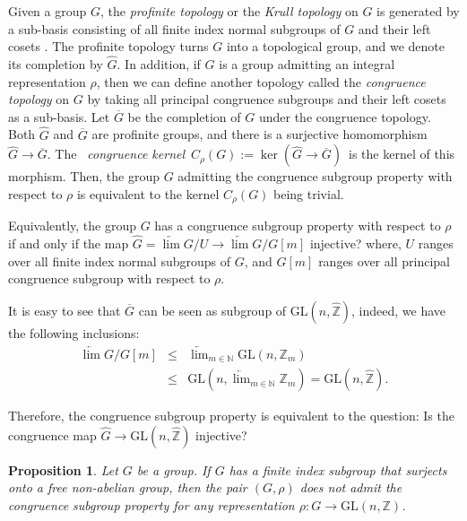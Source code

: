 \documentclass[12pt]{amsart}
\newtheorem{proposition}[equation]{Proposition}
\theoremstyle{definition}
\numberwithin{equation}{section}
\newcommand{\GL}{\mathrm{GL}}
\begin{document}
Given a group $G$, the {\it profinite topology} or the {\it Krull topology} on $G$ is generated by a sub-basis consisting of all finite index normal subgroups of $G$ and their left cosets \cite[Section 3.7]{surybook}. The profinite topology turns $G$ into a topological group, and we denote its completion by $\widehat{G}$. In addition, if $G$ is a group admitting an integral representation $\rho$, then we can define another topology called the {\it congruence topology} on $G$ by taking all principal congruence subgroups and their left cosets as a sub-basis. Let $\overline{G}$ be the completion of $G$ under the congruence topology. Both $\widehat{G}$ and $\overline{G}$ are profinite groups, and there is a surjective homomorphism $\widehat{G} \to \overline{G}$. The {\it congruence kernel} $C_{\rho}(G):=\ker(\widehat{G} \to \overline{G})$ is the kernel of this morphism. Then, the group $G$ admitting the congruence subgroup property with respect to $\rho$ is equivalent to the kernel $C_{\rho}(G)$ being trivial.

 Equivalently, the group $G$ has a congruence subgroup property with respect to $\rho$ if and only if the map  $\widehat{G}=\underleftarrow{\lim}G/U\to\underleftarrow{\lim}G/G[m]$ injective? where, $U$ ranges over all finite index normal subgroups of $G$, and $G[m]$ ranges over all principal congruence subgroup with respect to $\rho$. 

 It is easy to see that $\overline{G}$ can be seen as subgroup of $\GL(n,\hat{\mathbb Z})$, indeed, we have the following inclusions:
\begin{eqnarray*}
\underleftarrow{\lim}G/G[m] & \leq  &\underleftarrow{\lim}_{m\in\mathbb{N}} \GL(n,\mathbb Z_m)\\
 & \leq & \GL(n,\underleftarrow{\lim}_{m\in\mathbb{N}}\mathbb Z_m)=\GL(n,\hat{\mathbb Z}).
\end{eqnarray*}

Therefore, the congruence subgroup property is equivalent to the question: Is the congruence map  $\hat{G} \to \GL(n, \hat{\mathbb{Z}})$ injective?
\par

\begin{proposition}\label{thm:generalcsp}
Let $G$ be a group. If $G$ has a finite index subgroup that surjects onto a free non-abelian group, then the pair $(G,\rho)$ does not admit the congruence subgroup property for any representation $\rho:G \to \GL(n,\mathbb Z)$.
\end{proposition}
\end{document}
